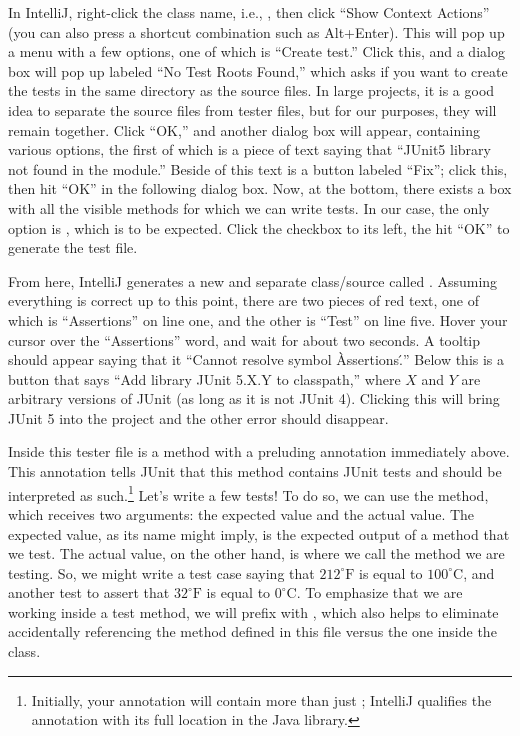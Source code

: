 In IntelliJ, right-click the class name, i.e., , then click ``Show Context Actions'' (you can also press a shortcut combination such as Alt+Enter). This will pop up a menu with a few options, one of which is ``Create test.'' Click this, and a dialog box will pop up labeled ``No Test Roots Found,'' which asks if you want to create the tests in the same directory as the source files. In large projects, it is a good idea to separate the source files from tester files, but for our purposes, they will remain together. Click ``OK,'' and another dialog box will appear, containing various options, the first of which is a piece of text saying that ``JUnit5 library not found in the module.'' Beside of this text is a button labeled ``Fix''; click this, then hit ``OK'' in the following dialog box. Now, at the bottom, there exists a box with all the visible methods for which we can write tests. In our case, the only option is , which is to be expected. Click the checkbox to its left, the hit ``OK'' to generate the test file.

From here, IntelliJ generates a new and separate class/source called . Assuming everything is correct up to this point, there are two pieces of red text, one of which is ``Assertions'' on line one, and the other is ``Test'' on line five. Hover your cursor over the ``Assertions'' word, and wait for about two seconds. A tooltip should appear saying that it ``Cannot resolve symbol \`Assertions\'.'' Below this is a button that says ``Add library JUnit 5.X.Y to classpath,'' where $X$ and $Y$ are arbitrary versions of JUnit (as long as it is not JUnit 4). Clicking this will bring JUnit 5 into the project and the other error should disappear.

Inside this tester file is a method  with a preluding annotation immediately above. This  annotation tells JUnit that this method contains JUnit tests and should be interpreted as such.\footnote{Initially, your annotation will contain more than just ; IntelliJ qualifies the annotation with its full location in the Java library.} Let's write a few tests! To do so, we can use the  method, which receives two arguments: the expected value and the actual value. The expected value, as its name might imply, is the expected output of a method that we test. The actual value, on the other hand, is where we call the method we are testing. So, we might write a test case saying that $212^{\circ}\text{F}$ is equal to $100^{\circ}\text{C}$, and another test to assert that $32^{\circ}\text{F}$ is equal to $0^{\circ}\text{C}$. To emphasize that we are working inside a test method, we will prefix  with , which also helps to eliminate accidentally referencing the  method defined in this file versus the one inside the  class.

